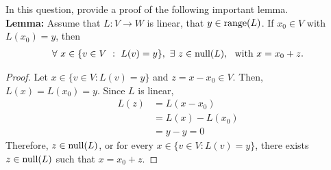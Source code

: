 \begin{question}\label{que:LemmaGenericSols}
	\normalfont
	
	In this question, provide a proof of the following important lemma. \\
	
	\textbf{Lemma:} Assume that $L:V\to W$ is linear, that $y\in\textnormal{range}(L)$. If $x_0\in V$ with $L(x_0)=y$, then 
	\begin{align*}
		\forall\ x\in\{ v\in V\ :\ L(v)=y \},\ \exists\ z\in \textnormal{null}(L),\ \ \text{with}\ x=x_0+z.
	\end{align*}
\end{question}

\begin{proof}
    \renewcommand{\qedsymbol}{$\blacksquare$}
    Let $x\in\{v\in V:L(v)=y\}$ and $z=x-x_0\in V$.
    Then, $L(x)=L(x_0)=y$.
    Since $L$ is linear, 
    \[
        \begin{aligned}
            L(z)
            &= L(x-x_0)\\
            &= L(x)-L(x_0)\\
            &= y-y = 0
        \end{aligned}
    \]
    Therefore, $z\in\textnormal{null}(L)$, or for every $x\in\{v\in V:L(v)=y\}$, there exists $z\in\textnormal{null}(L)$ such that $x=x_0+z$.
\end{proof}